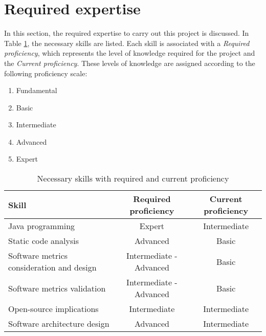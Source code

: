 \section{Required expertise}\label{section:requiredExpertise}
In this section, the required expertise to carry out this project is discussed.
In Table \ref{table:skills-proficiency}, the necessary skills are listed. Each skill is associated with a \textit{Required proficiency}, which represents the level of knowledge required for the project and the \textit{Current proficiency}. These levels of knowledge are assigned according to the following proficiency scale:

\begin{enumerate}
	\item   Fundamental
	\item   Basic
	\item   Intermediate
	\item   Advanced
	\item   Expert
\end{enumerate}

\begin{table}[ht!]
    \begin{center}
    \begin{tabularx}{\textwidth}{|X|c|c|}
    \hline
    Skill & Required proficiency & Current proficiency \\
    \hline\hline
    Java programming                            & Expert    & Intermediate \\
    \hline
    Static code analysis                        & Advanced  & Basic \\
    \hline
    Software metrics consideration and design   & Intermediate - Advanced  & Basic \\
    \hline
    Software metrics validation                 & Intermediate - Advanced & Basic \\
    \hline
    Open-source implications                    & Intermediate  & Intermediate \\
    \hline
    Software architecture design                & Advanced  & Intermediate \\
    \hline
  \end{tabularx}
    \end{center}
    \caption{Necessary skills with required and current proficiency}
    \label{table:skills-proficiency}
\end{table}
